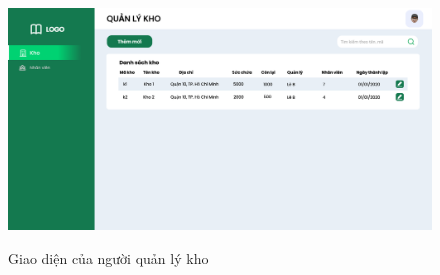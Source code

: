             \begin{figure}[!htp]
                \centering
                \includegraphics[width=12cm]{img/UI/admin/sub-admin -Quản lý kho.png}
                \label{47}
                \newline
                \caption{Giao diện của người quản lý kho }
            \end{figure}
    
    